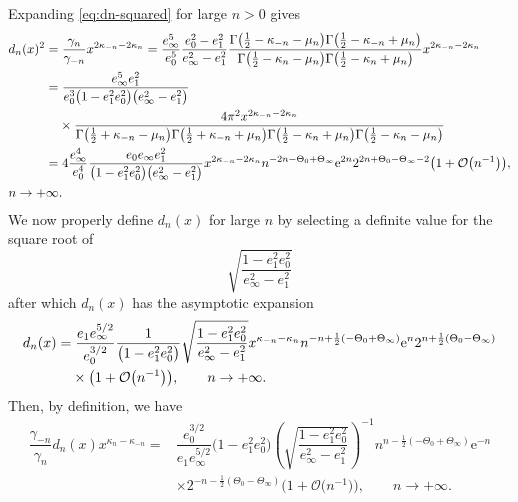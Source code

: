 \documentclass[pdftex]{sigma}
\numberwithin{equation}{section}
\newcommand{\ee}{\mathrm{e}}
\begin{document}
Expanding \eqref{eq:dn-squared} for large $n>0$ gives
\begin{align*}
& d_n(x)^2= \frac{\gamma_n}{\gamma_{-n}}x^{2\kappa_{-n}-2\kappa_n} = \dfrac{e_\infty^5}{e_0^5} \dfrac{e_0^2 - e_1^2}{e_\infty^2 - e_1^2} \dfrac{\Gamma\big( \frac{1}{2} - \kappa_{-n} -\mu_n\big) \Gamma\big( \frac{1}{2} - \kappa_{-n} + \mu_n\big)}{\Gamma\big( \frac{1}{2} - \kappa_{n} -\mu_n\big) \Gamma\big( \frac{1}{2} - \kappa_{n} +\mu_n\big)} x^{2\kappa_{-n}-2\kappa_n}\\
&\hphantom{d_n(x)^2}{} = \dfrac{e_\infty^5 e_1^2}{e_0^3\big(1 - e_1^2 e_0^2\big)\big(e_\infty^2 - e_1^2\big)} \\
&\hphantom{d_n(x)^2=}{} \times\dfrac{ 4\pi^2x^{2\kappa_{-n}-2\kappa_n}}{\Gamma \big( \frac{1}{2} + \kappa_{-n}- \mu_n \big) \Gamma \big( \frac{1}{2} + \kappa_{-n} + \mu_n \big) \Gamma \big( \frac{1}{2} - \kappa_n + \mu_n\big) \Gamma \big( \frac{1}{2} - \kappa_n - \mu_n \big)} \\
&\hphantom{d_n(x)^2}{}=
 4\dfrac{e_\infty^4}{e_0^4}\dfrac{e_0e_\infty e_1^2}{\big(1 - e_1^2 e_0^2\big)\big(e_\infty^2 - e_1^2\big)} x^{2\kappa_{-n}-2\kappa_n}n^{-2n-\Theta_0+\Theta_\infty}\ee^{2n}2^{2n+\Theta_0-\Theta_\infty-2}\big(1+\mathcal{O}\big(n^{-1}\big)\big), \\
& n \to +\infty.
\end{align*}
We now properly define $d_n(x)$ for large $n$ by selecting a definite value for the square root of
\begin{equation}
\label{eq:V-root}
\sqrt{\dfrac{1 - e_1^2 e_0^2}{e_\infty^2 - e_1^2} }
\end{equation}
after which $d_n(x)$ has the asymptotic expansion
\begin{align*}
&d_n(x) = \dfrac{e_1 e_\infty^{5/2}}{e_0^{3/2}} \dfrac{1}{\big(1 - e_1^2 e_0^2\big)}\sqrt{\dfrac{1 - e_1^2 e_0^2}{e_\infty^2 - e_1^2} } x^{\kappa_{-n}-\kappa_n} n^{-n+\frac{1}{2}(-\Theta_0+\Theta_\infty)}\ee^{n}2^{n + \frac{1}{2}(\Theta_0-\Theta_\infty)}\\
&\hphantom{d_n(x) =}{}
\times\big(1+\mathcal{O}\big(n^{-1}\big)\big), \qquad n \to +\infty.
\end{align*}
Then, by definition, we have
\begin{align*}
\dfrac{\gamma_{-n}}{\gamma_n} d_n(x) x^{\kappa_n - \kappa_{-n}} ={}& \dfrac{e_0^{3/2}}{e_1 e_\infty^{5/2}} {\big(1 - e_1^2 e_0^2\big)}\left(\sqrt{\dfrac{1 - e_1^2 e_0^2}{e_\infty^2 - e_1^2} }\right)^{-1}n^{n-\frac{1}{2}(-\Theta_0+\Theta_\infty)}\ee^{-n}\\&
\times2^{-n - \frac{1}{2}(\Theta_0-\Theta_\infty)}\big(1+\mathcal{O}\big(n^{-1}\big)\big),\qquad n \to +\infty.
\end{align*}
\end{document}
